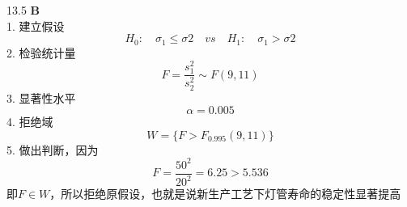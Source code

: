\documentclass[a4paper]{ctexart}    %
\begin{document}
	13.5 \quad \textbf{B} \\
	1. 建立假设
	\begin{equation*}
		H_0: \quad \sigma_1 \leq \sigma 2 \quad vs \quad H_1:\quad \sigma_1 > \sigma 2
	\end{equation*}
	2. 检验统计量
	\begin{equation*}
		F = \frac{s_1^2}{s_2^2} \sim F(9, 11)
	\end{equation*}
	3. 显著性水平
	\begin{equation*}
		\alpha = 0.005
	\end{equation*}
	4. 拒绝域
	\begin{equation*}
		W = \{F > F_{0.995}(9, 11)\}
	\end{equation*}
	5. 做出判断，因为
	\begin{equation*}
		F = \frac{50^2}{20^2} = 6.25 > 5.536
	\end{equation*}
	即$ F \in W $，所以拒绝原假设，也就是说新生产工艺下灯管寿命的稳定性显著提高
	\newpage
\end{document}
